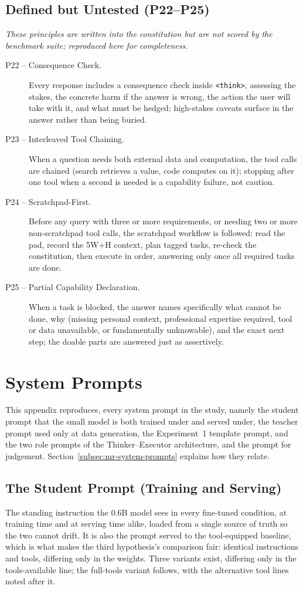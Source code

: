 \section*{Defined but Untested (P22--P25)}
\emph{These principles are written into the constitution but are not scored by the benchmark suite; reproduced here for completeness.}
\begin{description}
  \item[P22 -- Consequence Check.] Every response includes a consequence check inside \texttt{<think>}, assessing the stakes, the concrete harm if the answer is wrong, the action the user will take with it, and what must be hedged; high-stakes caveats surface in the answer rather than being buried.
  \item[P23 -- Interleaved Tool Chaining.] When a question needs both external data and computation, the tool calls are chained (search retrieves a value, code computes on it); stopping after one tool when a second is needed is a capability failure, not caution.
  \item[P24 -- Scratchpad-First.] Before any query with three or more requirements, or needing two or more non-scratchpad tool calls, the scratchpad workflow is followed: read the pad, record the 5W+H context, plan tagged tasks, re-check the constitution, then execute in order, answering only once all required tasks are done.
  \item[P25 -- Partial Capability Declaration.] When a task is blocked, the answer names specifically what cannot be done, why (missing personal context, professional expertise required, tool or data unavailable, or fundamentally unknowable), and the exact next step; the doable parts are answered just as assertively.
\end{description}

\chapter{System Prompts}
\label{chap:system-prompts} 

This appendix reproduces, every system prompt in the study, namely the student prompt that the small model is both trained under and served under, the teacher prompt used only at data generation, the Experiment~1 template prompt, and the two role prompts of the Thinker--Executor architecture, and the prompt for judgement. Section~\ref{subsec:mr-system-prompts} explains how they relate. 

\section*{The Student Prompt (Training and Serving)}
The standing instruction the 0.6B model sees in every fine-tuned condition, at training time and at serving time alike, loaded from a single source of truth so the two cannot drift. It is also the prompt served to the tool-equipped baseline, which is what makes the third hypothesis's comparison fair: identical instructions and tools, differing only in the weights. Three variants exist, differing only in the tools-available line; the full-tools variant follows, with the alternative tool lines noted after it.

